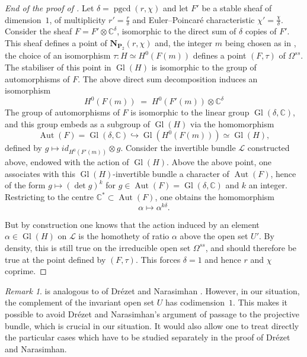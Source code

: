 \documentclass[12pt,english]{smfart}%
\theoremstyle{plain}
\theoremstyle{definition}
\theoremstyle{remark}
\newtheorem{remark}[theorem]{Remark}
\newcommand{\PP}{\mathbf{P}}
\newcommand{\CC}{\mathbb{C}}
\DeclareMathOperator{\Aut}{Aut}
\DeclareMathOperator{\Gl}{Gl}
\newcommand{\gcdd}{\operatorname{pgcd}}
\newcommand{\origpage}[1]{\marginnote{\scriptsize\itshape p.~#1}}
\begin{document}
\begin{proof}[End of the proof of ]
Let $\delta=\gcdd(r,\chi)$ and let $F'$ be a stable sheaf of dimension~$1$, of multiplicity $r'=\frac{r}{\delta}$ and Euler--Poincar\'e characteristic $\chi'=\frac{\chi}{\delta}$. Consider the sheaf $F=F'\otimes\CC^{\delta}$, isomorphic to the direct sum of $\delta$ copies of $F'$. This sheaf
\origpage{656}%
defines a point of $\mathbf{N}_{\PP_{2}}(r,\chi)$ and, the integer $m$ being chosen as in , the choice of an isomorphism $\tau:H\simeq H^{0}(F(m))$ defines a point $(F,\tau)$ of $\Omega^{ss}$. The stabiliser of this point in $\Gl(H)$ is isomorphic to the group of automorphisms of $F$. The above direct sum decomposition induces an isomorphism
\[
H^{0}(F(m)) \;=\; H^{0}(F'(m)) \otimes \CC^{\delta}
\]
The group of automorphisms of $F$ is isomorphic to the linear group $\Gl(\delta,\CC)$, and this group embeds as a subgroup of $\Gl(H)$ via the homomorphism
\[
\Aut(F) = \Gl(\delta,\CC) \hookrightarrow \Gl(H^{0}(F(m))) \simeq \Gl(H),
\]
defined by $g\mapsto id_{H^{0}(F'(m))}\otimes g$. Consider the invertible bundle $\mathscr{L}$ constructed above, endowed with the action of $\Gl(H)$. Above the above point, one associates with this $\Gl(H)$-invertible bundle a character of $\Aut(F)$, hence of the form $g\mapsto(\det g)^{k}$ for $g\in\Aut(F)=\Gl(\delta,\CC)$ and $k$ an integer. Restricting to the centre $\CC^{*}\subset\Aut(F)$, one obtains the homomorphism
\[
\alpha \longmapsto \alpha^{k\delta}.
\]

But by construction one knows that the action induced by an element $\alpha\in\Gl(H)$ on $\mathscr{L}$ is the homothety of ratio $\alpha$ above the open set $U'$. By density, this is still true on the irreducible open set $\Omega^{ss}$, and should therefore be true at the point defined by $(F,\tau)$. This forces $\delta=1$ and hence $r$ and $\chi$ coprime.
\end{proof}

\begin{remark}\label{rem:DN}
 is analogous to  of Dr\'ezet and Narasimhan \cite{Dre3}. However, in our situation, the complement of the invariant open set $U$ has codimension~$1$. This makes it possible to avoid Dr\'ezet and Narasimhan's argument of passage to the projective bundle, which is crucial in our situation. It would also allow one to treat directly the particular cases which have to be studied separately in the proof of Dr\'ezet and Narasimhan.
\end{remark}
\end{document}
